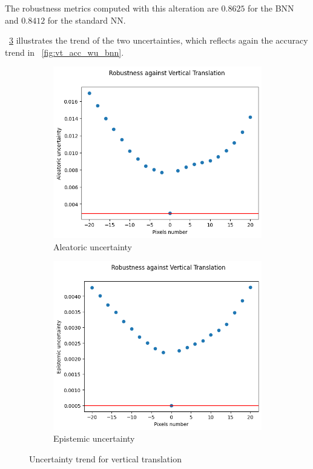 The robustness metrics computed with this alteration are $0.8625$ for the BNN and $0.8412$ for the standard NN.

\Fig~\ref{fig:vt_uncertainty} illustrates the trend of the two uncertainties, which reflects again the accuracy trend in \Fig~\ref{fig:vt_acc_wu_bnn}.

\begin{figure}[h]
	\centering
	\begin{subfigure}{.5\textwidth}
		\centering
		\includegraphics[width=0.9\linewidth]{ImageFiles/EvalBNN/VT/aleatoric}
		\caption{Aleatoric uncertainty}
		\label{fig:vt_aleatoric}
	\end{subfigure}%
	\begin{subfigure}{.5\textwidth}
		\centering
		\includegraphics[width=0.9\linewidth]{ImageFiles/EvalBNN/VT/epistemic}
		\caption{Epistemic uncertainty}
		\label{fig:vt_epistemic}
	\end{subfigure}
	\caption{Uncertainty trend for vertical translation}
	\label{fig:vt_uncertainty}
\end{figure}

